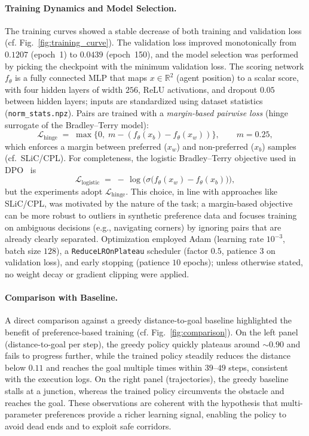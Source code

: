 \documentclass[a4paper,oneside,10pt,ngerman,english]{scrartcl}
\begin{document}
\paragraph{Training Dynamics and Model Selection.}
The training curves showed a stable decrease of both training and validation loss (cf. Fig.~\ref{fig:training_curve}).
The validation loss improved monotonically from $0.1207$ (epoch~1) to $0.0439$ (epoch~150), and the model selection was performed by picking the checkpoint with the minimum validation loss.
The scoring network $f_\theta$ is a fully connected MLP that maps $x\in\mathbb{R}^2$ (agent position) to a scalar score, with four hidden layers of width $256$, ReLU activations, and dropout $0.05$ between hidden layers; inputs are standardized using dataset statistics (\texttt{norm\_stats.npz}).
Pairs are trained with a \emph{margin-based pairwise loss} (hinge surrogate of the Bradley--Terry model):
\[
\mathcal{L}_{\text{hinge}} \;=\; \max\{0,\; m - (f_\theta(x_b)-f_\theta(x_w))\}, \qquad m=0.25,
\]
which enforces a margin between preferred ($x_w$) and non-preferred ($x_b$) samples (cf.\ SLiC/CPL).
For completeness, the logistic Bradley--Terry objective used in DPO~\cite{rafailov2023direct} is
\[
\mathcal{L}_{\text{logistic}} \;=\; -\,\log\!\bigl(\sigma\bigl(f_\theta(x_w)-f_\theta(x_b)\bigr)\bigr),
\]
but the experiments adopt $\mathcal{L}_{\text{hinge}}$. This choice, in line with approaches like SLiC/CPL, was motivated by the nature of the task; a margin-based objective can be more robust to outliers in synthetic preference data and focuses training on ambiguous decisions (e.g., navigating corners) by ignoring pairs that are already clearly separated.
Optimization employed Adam (learning rate $10^{-3}$, batch size $128$), a \texttt{ReduceLROnPlateau} scheduler (factor $0.5$, patience $3$ on validation loss), and early stopping (patience $10$ epochs); unless otherwise stated, no weight decay or gradient clipping were applied.


\paragraph{Comparison with Baseline.}
A direct comparison against a greedy distance-to-goal baseline highlighted the benefit of preference-based training (cf. Fig.~\ref{fig:comparison}). On the left panel (distance-to-goal per step), the greedy policy quickly plateaus around $\sim 0.90$ and fails to progress further, while the trained policy steadily reduces the distance below $0.11$ and reaches the goal multiple times within $39$--$49$ steps, consistent with the execution logs. On the right panel (trajectories), the greedy baseline stalls at a junction, whereas the trained policy circumvents the obstacle and reaches the goal. These observations are coherent with the hypothesis that multi-parameter preferences provide a richer learning signal, enabling the policy to avoid dead ends and to exploit safe corridors.
\end{document}
